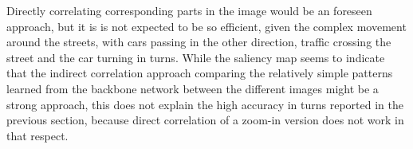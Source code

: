 Directly correlating corresponding parts in the image would be an foreseen approach, but it is is not expected to be so efficient, given the complex movement around the streets, with cars passing in the other direction, traffic crossing the street and the car turning in turns. While the saliency map seems to indicate that the indirect correlation approach comparing the relatively simple patterns learned from the backbone network between the different images might be a strong approach, this does not explain the high accuracy in turns reported in the previous section, because direct correlation of a zoom-in version does not work in that respect. 


